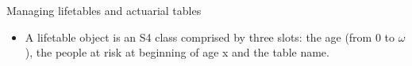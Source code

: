 \begin{frame}[fragile]{Managing lifetables and actuarial tables}

\begin{itemize}[<+->]
\itemsep1pt\parskip0pt
\item
  A lifetable object is an S4 class comprised by three slots: the age
  (from 0 to \(\omega\)), the people at risk at beginning of age x and
  the table name.
\end{itemize}

\begin{Shaded}
\begin{Highlighting}[]
\NormalTok{(}\NormalTok{,}\NormalTok{,}\NormalTok{)}
\NormalTok{(}\NormalTok{,}\NormalTok{,}\NormalTok{,}\NormalTok{,}\NormalTok{,}\NormalTok{)}
\NormalTok{(}\NormalTok{,}
                   \NormalTok{)}
\end{Highlighting}
\end{Shaded}

\end{frame}

